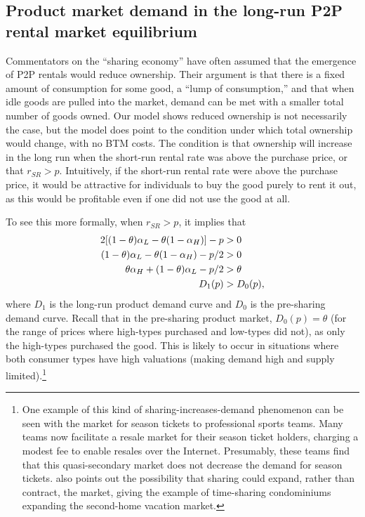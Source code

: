\documentclass[11pt]{article}
\begin{document}
\subsection{Product market demand in the long-run P2P rental market equilibrium} 

Commentators on the ``sharing economy'' have often assumed that the emergence of P2P rentals would reduce ownership. 
Their argument is that there is a fixed amount of consumption for some good, a ``lump of consumption,'' and that when idle goods are pulled into the market, demand can be met with a smaller total number of goods owned.
Our model shows reduced ownership is not necessarily the case, but the model does point to the condition under which total ownership would change, with no BTM costs.
The condition is that ownership will increase in the long run when the short-run rental rate was above the purchase price, or that $r_{SR} > p$. 
Intuitively, if the short-run rental rate were above the purchase price, it would be attractive for individuals to buy the good purely to rent it out, as this would be profitable even if one did not use the good at all.

To see this more formally, when $r_{SR} > p$, it implies that
\begin{align}
 2[(1- \theta) \alpha_L - \theta(1 - \alpha_H)] - p &> 0 \notag \\
(1- \theta) \alpha_L - \theta(1 - \alpha_H) - p/2 &> 0 \notag \\
\theta \alpha_H + (1- \theta) \alpha_L - p/2 &> \theta \notag \\
 D_{1}(p) & > D_{0}(p), \notag \\
\end{align}
where $D_{1}$ is the long-run product demand curve and $D_{0}$ is the pre-sharing demand curve.
Recall that in the pre-sharing product market, $D_0(p) = \theta$ (for the range of prices where high-types purchased and low-types did not), as only the high-types purchased the good. 
This is likely to occur in situations where both consumer types have high valuations (making demand high and supply limited).\footnote{ 
  One example of this kind of sharing-increases-demand phenomenon can be seen with the market for season tickets to professional sports teams.
  Many teams now facilitate a resale market for their season ticket holders, charging a modest fee to enable resales over the Internet.
  Presumably, these teams find that this quasi-secondary market does not decrease the demand for season tickets.
  \cite{belk2014you} also points out the possibility that sharing could expand, rather than contract, the market, giving the example of time-sharing condominiums expanding the second-home vacation market. 
}
\end{document}

